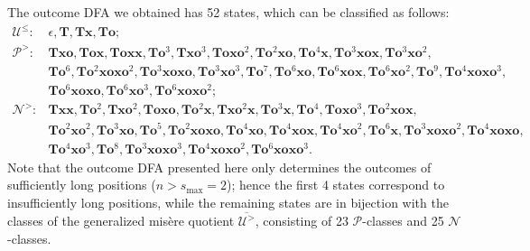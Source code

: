 \documentclass[11pt]{article}
\theoremstyle{definition}
\theoremstyle{plain}
\newcommand{\varP}{\mathcal{P}}
\newcommand{\varN}{\mathcal{N}}
\newcommand{\x}{\mathbf{x}}
\newcommand{\e}{\mathbf{o}}
\newcommand{\m}{\mathbf{T}}
\newcommand{\varU}{\mathcal{U}}
\begin{document}
The outcome DFA we obtained has 52 states, which can be classified as follows:
\tiny
\begin{align*}
    \varU^{\leq}: & \epsilon, \m, \m\x, \m\e; \\
    \varP^>:      & \m\x\e, \m\e\x, \m\e\x\x, \m\e^3, \m\x\e^3, \m\e\x\e^2, \m\e^2\x\e, \m\e^4\x, \m\e^3\x\e\x, \m\e^3\x\e^2, \\
                  & \m\e^6, \m\e^2\x\e\x\e^2, \m\e^3\x\e\x\e, \m\e^3\x\e^3, \m\e^7, \m\e^6\x\e, \m\e^6\x\e\x, \m\e^6\x\e^2, \m\e^9, \m\e^4\x\e\x\e^3, \\
                  & \m\e^6\x\e\x\e, \m\e^6\x\e^3, \m\e^6\x\e\x\e^2;\\
    \varN^>:      & \m\x\x, \m\e^2, \m\x\e^2, \m\e\x\e, \m\e^2\x, \m\x\e^2\x, \m\e^3\x, \m\e^4, \m\e\x\e^3, \m\e^2\x\e\x, \\
                  & \m\e^2\x\e^2, \m\e^3\x\e, \m\e^5, \m\e^2\x\e\x\e, \m\e^4\x\e, \m\e^4\x\e\x, \m\e^4\x\e^2, \m\e^6\x, \m\e^3\x\e\x\e^2, \m\e^4\x\e\x\e, \\
                  & \m\e^4\x\e^3, \m\e^8, \m\e^3\x\e\x\e^3, \m\e^4\x\e\x\e^2, \m\e^6\x\e\x\e^3.
\end{align*}\normalsize
Note that the outcome DFA presented here only determines the outcomes of sufficiently long positions ($n> s_{\max}=2$);
hence the first 4 states correspond to insufficiently long positions, while the remaining states are in bijection with the classes of the generalized misère quotient $\overline{\varU^>}$,
consisting of 23 $\varP$-classes and 25 $\varN$-classes.
\end{document}
